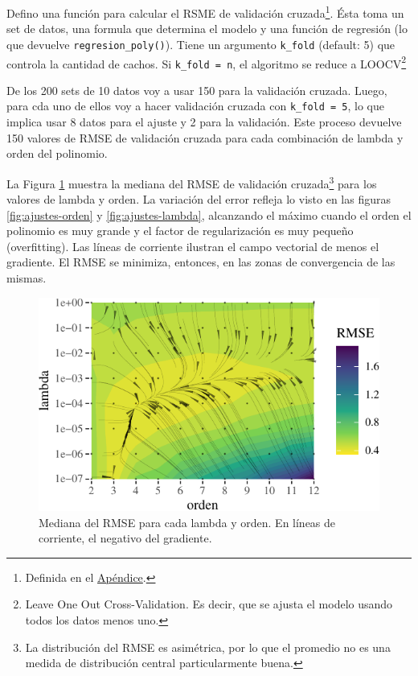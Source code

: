 \documentclass[]{tufte-handout}
\begin{document}
Defino una función para calcular el RSME de validación cruzada\footnote{Definida en el \protect\hyperlink{def-cv}{Apéndice}.}. Ésta toma un set de datos, una formula que determina el modelo y una función de regresión (lo que devuelve \texttt{regresion\_poly()}). Tiene un argumento \texttt{k\_fold} (default: 5) que controla la cantidad de cachos. Si \texttt{k\_fold\ =\ n}, el algoritmo se reduce a LOOCV\footnote{Leave One Out Cross-Validation. Es decir, que se ajusta el modelo usando todos los datos menos uno.}

De los 200 sets de 10 datos voy a usar 150 para la validación cruzada. Luego, para cda uno de ellos voy a hacer validación cruzada con \texttt{k\_fold\ =\ 5}, lo que implica usar 8 datos para el ajuste y 2 para la validación. Este proceso devuelve 150 valores de RMSE de validación cruzada para cada combinación de lambda y orden del polinomio.

La Figura \ref{fig:rmse-campo} muestra la mediana del RMSE de validación cruzada\footnote{La distribución del RMSE es asimétrica, por lo que el promedio no es una medida de distribución central particularmente buena.} para los valores de lambda y orden. La variación del error refleja lo visto en las figuras \ref{fig:ajustes-orden} y \ref{fig:ajustes-lambda}, alcanzando el máximo cuando el orden el polinomio es muy grande y el factor de regularización es muy pequeño (overfitting). Las líneas de corriente ilustran el campo vectorial de menos el gradiente. El RMSE se minimiza, entonces, en las zonas de convergencia de las mismas.

\begin{figure}
\includegraphics{README_files/figure-latex/rmse-campo-1} \caption[Mediana del RMSE para cada lambda y orden]{Mediana del RMSE para cada lambda y orden. En líneas de corriente, el negativo del gradiente.}\label{fig:rmse-campo}
\end{figure}
\end{document}
